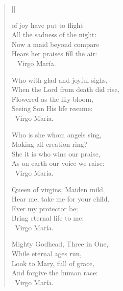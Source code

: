 \newHymn
{}

\begin{verse}[\versewidth]

 of joy have put to flight\\
All the sadness of the night:\\
Now a maid beyond compare\\
Hears her praises fill the air:\\
~ \quad Virgo María.
\pointorig

Who with glad and joyful sighs,\\
When the Lord from death did rise,\\
Flowered as the lily bloom,\\
Seeing Son His life resume:\\
\ \quad Virgo María.

Who is she whom angels sing,\\
Making all creation ring?\\
She it is who wins our praise,\\
As on earth our voice we raise:\\
\ \quad Virgo María.

Queen of virgins, Maiden mild,\\
Hear me, take me for your child.\\
Ever my protector be;\\
Bring eternal life to me:\\
\ \quad Virgo María.

Mighty Godhead, Three in One,\\
While eternal ages run,\\
Look to Mary, full of grace,\\
And forgive the human race:\\
\ \quad Virgo María.

\end{verse}

